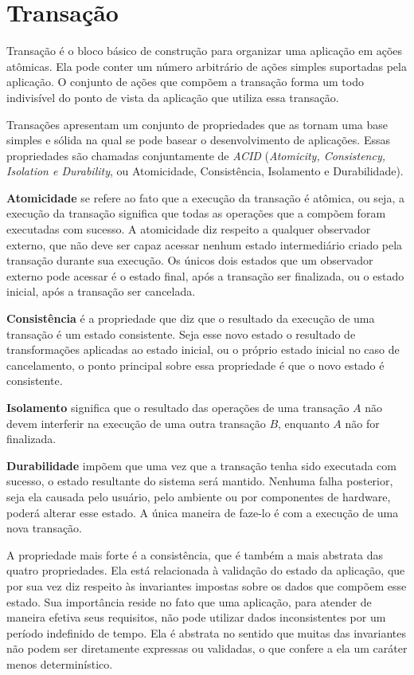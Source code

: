 \documentclass[11pt,twoside,a4paper]{book}
\begin{document}
\section{Transação}
\label{sec:transacao}
Transação é o bloco básico de construção para organizar uma aplicação em ações atômicas. Ela pode conter um número arbitrário de ações simples suportadas pela aplicação. O conjunto de ações que compõem a transação forma um todo indivisível do ponto de vista da aplicação que utiliza essa transação.

Transações apresentam um conjunto de propriedades que as tornam uma base simples e sólida na qual se pode basear o desenvolvimento de aplicações. Essas propriedades são chamadas conjuntamente de \emph{ACID} (\emph{Atomicity, Consistency, Isolation e Durability}, ou Atomicidade, Consistência, Isolamento e Durabilidade). 

\textbf{Atomicidade} se refere ao fato que a execução da transação é atômica, ou seja, a execução da transação significa que todas as operações que a compõem foram executadas com sucesso. A atomicidade diz respeito a qualquer observador externo, que não deve ser capaz acessar nenhum estado intermediário criado pela transação durante sua execução. Os únicos dois estados que um observador externo pode acessar é o estado final, após a transação ser finalizada, ou o estado inicial, após a transação ser cancelada.

\textbf{Consistência} é a propriedade que diz que o resultado da execução de uma transação é um estado consistente. Seja esse novo estado o resultado de transformações aplicadas ao estado inicial, ou o próprio estado inicial no caso de cancelamento, o ponto principal sobre essa propriedade é que o novo estado é consistente.

\textbf{Isolamento} significa que o resultado das operações de uma transação $A$ não devem interferir na execução de uma outra transação $B$, enquanto $A$ não for finalizada.

\textbf{Durabilidade} impõem que uma vez que a transação tenha sido executada com sucesso, o estado resultante do sistema será mantido. Nenhuma falha posterior, seja ela causada pelo usuário, pelo ambiente ou por componentes de hardware, poderá alterar esse estado. A única maneira de faze-lo é com a execução de uma nova transação.

A propriedade mais forte é a consistência, que é também a mais abstrata das quatro propriedades. Ela está relacionada à validação do estado da aplicação, que por sua vez diz respeito às invariantes impostas sobre os dados que compõem esse estado. Sua importância reside no fato que uma aplicação, para atender de maneira efetiva seus requisitos, não pode utilizar dados inconsistentes por um período indefinido de tempo. Ela é abstrata no sentido que muitas das invariantes não podem ser diretamente expressas ou validadas, o que confere a ela um caráter menos determinístico.
\end{document}
